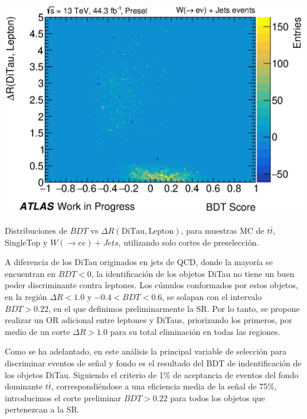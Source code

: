 \begin{marginfigure}
    \noindent\includegraphics[width=0.99\linewidth]{Assets/Plots/Presel/h_mc16d_WjetsEnu_ditau_bdt_lepton_dr.eps}
    \caption{Distribuciones de $BDT$ vs $\Delta R(\text{DiTau}, \text{Lepton})$, para muestras MC de $t\bar{t}$, SingleTop y $W(\to ee) + Jets$, utilizando solo cortes de preselección.}
    \label{fig:ch4:presel:h_ditau_bdt_lepton_dr}
\end{marginfigure}

A diferencia de los DiTau  originados en jets de QCD, donde la mayoría se encuentran en $BDT < 0$, la identificación de los objetos DiTau no tiene un buen poder discriminante contra leptones. Los cúmulos conformados por estos objetos, en la región $\Delta R < 1.0$ y $-0.4 < BDT < 0.6$, se solapan con el intervalo $BDT > 0.22$, en el que definimos preliminarmente la SR. Por lo tanto, se propone realizar un OR adicional entre leptones y DiTaus, priorizando los primeros, por medio de un corte $\Delta R > 1.0$ para su total eliminación en todas las regiones.







Como se ha adelantado, en este análisis la principal variable de selección para discriminar eventos de señal y fondo es el resultado del BDT de indentificación de los objetos DiTau. Siguiendo el criterio de 1\% de aceptancia de eventos del fondo dominante $t\bar{t}$, correspondiéndose a una eficiencia media de la señal de 75\%, introducimos el corte preliminar $BDT > 0.22$ para todos los objetos que pertenezcan a la SR.

